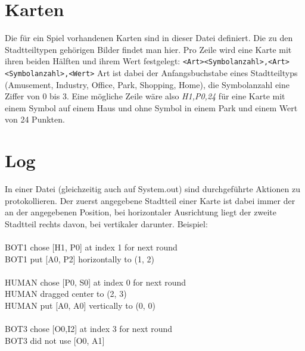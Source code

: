 \section{Karten}
Die für ein Spiel vorhandenen Karten sind in dieser Datei definiert. Die zu den Stadtteiltypen gehörigen Bilder findet man hier.
Pro Zeile wird eine Karte mit ihren beiden Hälften und ihrem Wert festgelegt:
\verb|<Art><Symbolanzahl>,<Art><Symbolanzahl>,<Wert>|
Art ist dabei der Anfangsbuchstabe eines Stadtteiltyps (Amusement, Industry, Office, Park, Shopping, Home), die Symbolanzahl eine Ziffer von 0 bis 3. Eine mögliche Zeile wäre also \emph{H1,P0,24}
für eine Karte mit einem Symbol auf einem Haus und ohne Symbol in einem Park und einem Wert von 24 Punkten.

\section{Log}
In einer Datei (gleichzeitig auch auf System.out) sind durchgeführte Aktionen zu protokollieren. Der zuerst angegebene Stadtteil einer Karte ist dabei immer der an der angegebenen Position, bei horizontaler Ausrichtung liegt der zweite Stadtteil rechts davon, bei vertikaler darunter. Beispiel:\\
\\BOT1 chose [H1, P0] at index 1 for next round
\\BOT1 put [A0, P2] horizontally to (1, 2)\\
\\HUMAN chose [P0, S0] at index 0 for next round
\\HUMAN dragged center to (2, 3)
\\HUMAN put [A0, A0] vertically to (0, 0)\\
\\BOT3 chose [O0,I2] at index 3 for next round
\\BOT3 did not use [O0, A1]

